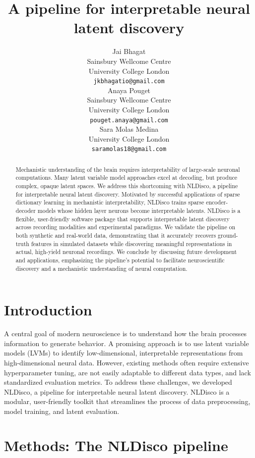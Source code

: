 \documentclass{article}
\title{A pipeline for interpretable neural latent discovery}
\author{
  Jai Bhagat \\
  Sainsbury Wellcome Centre \\
  University College London \\
  \texttt{jkbhagatio@gmail.com} \\
  \And
  Anaya Pouget \\
  Sainsbury Wellcome Centre \\
  University College London \\
  \texttt{pouget.anaya@gmail.com} \\
  \And
  Sara Molas Medina \\
  University College London \\
  \texttt{saramolas18@gmail.com} \\
}
\begin{document}
\maketitle

\begin{abstract}
Mechanistic understanding of the brain requires interpretability of large-scale neuronal computations. Many latent variable model approaches excel at decoding, but produce complex, opaque latent spaces. We address this shortcoming with NLDisco, a pipeline for interpretable neural latent discovery. Motivated by successful applications of sparse dictionary learning in mechanistic interpretability, NLDisco trains sparse encoder-decoder models whose hidden layer neurons become interpretable latents. NLDisco is a flexible, user-friendly software package that supports interpretable latent discovery across recording modalities and experimental paradigms. We validate the pipeline on both synthetic and real-world data, demonstrating that it accurately recovers ground-truth features in simulated datasets while discovering meaningful representations in actual, high-yield neuronal recordings. We conclude by discussing future development and applications, emphasizing the pipeline's potential to facilitate neuroscientific discovery and a mechanistic understanding of neural computation.
\end{abstract}

\section{Introduction}

A central goal of modern neuroscience is to understand how the brain processes information to generate behavior. A promising approach is to use latent variable models (LVMs) to identify low-dimensional, interpretable representations from high-dimensional neural data. However, existing methods often require extensive hyperparameter tuning, are not easily adaptable to different data types, and lack standardized evaluation metrics. To address these challenges, we developed NLDisco, a pipeline for interpretable neural latent discovery. NLDisco is a modular, user-friendly toolkit that streamlines the process of data preprocessing, model training, and latent evaluation.

\section{Methods: The NLDisco pipeline}
\end{document}
